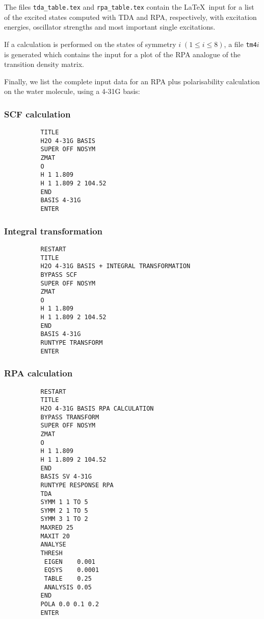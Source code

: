 \documentclass[11pt,fleqn]{article}
\begin{document}
The files {\tt tda\_table.tex} and {\tt rpa\_table.tex} contain the
\LaTeX\ input for a list of the excited states computed with TDA and RPA,
respectively, with excitation energies, oscillator strengths and
most important single excitations.

If a calculation is performed on the states of symmetry $i\;
(1\leq i\leq 8)$, a file {\tt tm4$i$} is generated
which contains the input for a plot of the RPA analogue of the 
transition density matrix.

Finally, we list the complete input data for an RPA plus polarisability 
calculation on the water molecule, using a 4-31G basis:
%
\subsubsection{SCF calculation}
{
\footnotesize
\begin{verbatim}
          TITLE
          H2O 4-31G BASIS 
          SUPER OFF NOSYM
          ZMAT
          O
          H 1 1.809 
          H 1 1.809 2 104.52 
          END
          BASIS 4-31G
          ENTER
\end{verbatim}
}
%
\subsubsection{Integral transformation}
{
\footnotesize
\begin{verbatim}
          RESTART
          TITLE
          H2O 4-31G BASIS + INTEGRAL TRANSFORMATION
          BYPASS SCF
          SUPER OFF NOSYM
          ZMAT
          O
          H 1 1.809 
          H 1 1.809 2 104.52 
          END
          BASIS 4-31G
          RUNTYPE TRANSFORM
          ENTER
\end{verbatim}
}
%
\subsubsection{RPA calculation}
{
\footnotesize
\begin{verbatim}
          RESTART
          TITLE
          H2O 4-31G BASIS RPA CALCULATION
          BYPASS TRANSFORM
          SUPER OFF NOSYM
          ZMAT
          O
          H 1 1.809 
          H 1 1.809 2 104.52 
          END
          BASIS SV 4-31G
          RUNTYPE RESPONSE RPA
          TDA
          SYMM 1 1 TO 5
          SYMM 2 1 TO 5
          SYMM 3 1 TO 2
          MAXRED 25
          MAXIT 20
          ANALYSE
          THRESH
           EIGEN    0.001
           EQSYS    0.0001
           TABLE    0.25
           ANALYSIS 0.05
          END
          POLA 0.0 0.1 0.2
          ENTER
\end{verbatim}
}
%
\end{document}
